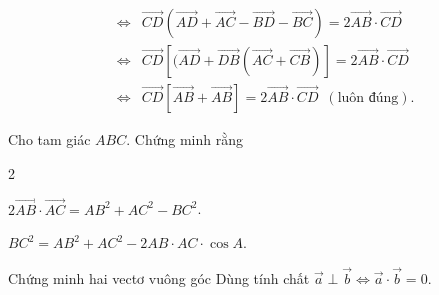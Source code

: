 \begin{vd}
{\begin{eqnarray*}
		&\Leftrightarrow&\overrightarrow{CD}\left(\overrightarrow{AD}+\overrightarrow{AC}-\overrightarrow{BD}-\overrightarrow{BC}\right)=2\overrightarrow{AB}\cdot\overrightarrow{CD}\\
		&\Leftrightarrow&\overrightarrow{CD}\left[(\overrightarrow{AD}+\overrightarrow{DB}\left(\overrightarrow{AC}+\overrightarrow{CB}\right)\right]=2\overrightarrow{AB}\cdot\overrightarrow{CD}\\
		&\Leftrightarrow&\overrightarrow{CD}\left[\overrightarrow{AB}+\overrightarrow{AB}
		\right]=2\overrightarrow{AB}\cdot\overrightarrow{CD}\;~(\text{luôn đúng}).
	\end{eqnarray*}
	}
\end{vd}
\begin{vd}%
	Cho tam giác $ABC$. Chứng minh rằng
	\begin{enumEX}[a)]{2}
		\item $2\overrightarrow{AB}\cdot\overrightarrow{AC}=AB^2+AC^2-BC^2$.
		\item $BC^2=AB^2+AC^2-2AB\cdot AC\cdot \cos A$.
	\end{enumEX}
\end{vd}
\begin{dang}{Chứng minh hai vectơ vuông góc}
	Dùng tính chất $\overrightarrow{a}\perp \overrightarrow{b}\Leftrightarrow \overrightarrow{a}\cdot\overrightarrow{b}=0.$\end{dang}
